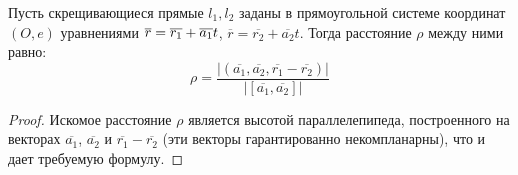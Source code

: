 \begin{proposition}
	Пусть скрещивающиеся прямые $l_1, l_2$ заданы в прямоугольной системе координат $(O, e)$ уравнениями $\overline{r} = \overline{r_1} \hm{+} \overline{a_1}t$, $\overline{r} = \overline{r_2} + \overline{a_2}t$. Тогда расстояние $\rho$ между ними равно:
	\[\rho = \frac{|(\overline{a_1}, \overline{a_2}, \overline{r_1} - \overline{r_2})|}{|[\overline{a_1}, \overline{a_2}]|}\]
\end{proposition}

\begin{proof}
	Искомое расстояние $\rho$ является высотой параллелепипеда, построенного на векторах $\overline{a_1}$, $\overline{a_2}$ и $\overline{r_1} - \overline{r_2}$ (эти векторы гарантированно некомпланарны), что и дает требуемую формулу.
\end{proof}